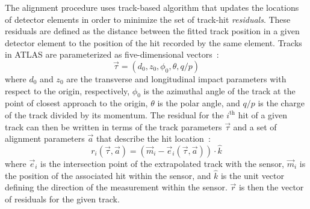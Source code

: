 The alignment procedure uses track-based algorithm that updates the locations of detector elements in order to minimize the set of track-hit \emph{residuals}.
These residuals are defined as the distance between the fitted track position in a given detector element to the position of the hit recorded by the same element.
Tracks in ATLAS are parameterized as five-dimensional vectors~\cite{2006.atlas-tracking-model}:%
\begin{equation}
  \vec{\tau} = (d_0,z_0,\phi_0,\theta,q/p)
\end{equation}
where $d_0$ and $z_0$ are the transverse and longitudinal impact parameters with respect to the origin, respectively, $\phi_0$ is the azimuthal angle of the track at the point of closest approach to the origin, $\theta$ is the polar angle, and $q/p$ is the charge of the track divided by its momentum.
The residual for the $i^{\textrm{th}}$ hit of a given track can then be written in terms of the track parameters $\vec{\tau}$ and a set of alignment parameters $\vec{a}$ that describe the hit location~\cite{2005.global-chi2-alignment}:
\begin{equation}
  r_i(\vec{\tau},\vec{a}) = (\vec{m}_i - \vec{e}_i (\vec{\tau},\vec{a}))\cdot\hat{k}
\end{equation}
where $\vec{e}_i$ is the intersection point of the extrapolated track with the sensor, $\vec{m}_i$ is the position of the associated hit within the sensor, and $\hat{k}$ is the unit vector defining the direction of the measurement within the sensor.
$\vec{r}$ is then the vector of residuals for the given track.

